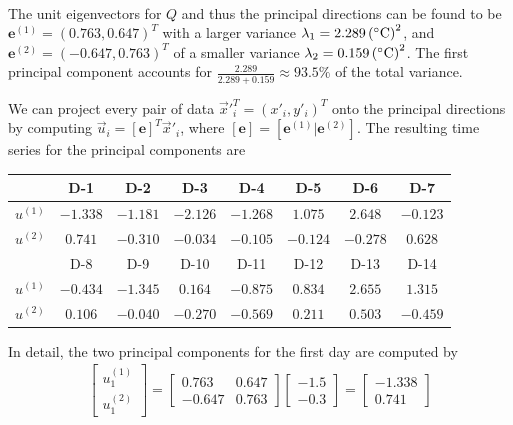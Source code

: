 \begin{solution}
\begin{align*}
\end{align*}
The unit eigenvectors for $Q$ and thus the principal directions can be found to be $\textbf{e}^{(1)} = (0.763, 0.647)^T$ with a larger variance $\lambda_1 = \SI{2.289}{\square {(\degree C)}}$, and $\textbf{e}^{(2)} = (-0.647, 0.763)^T$ of a smaller variance $\lambda_2 = \SI{0.159}{\square {(\degree C)}}$. The first principal component accounts for $\frac{2.289}{2.289+0.159} \approx 93.5\%$ of the total variance.\par
We can project every pair of data $\vec{x}'^T_i = (x'_i, y'_i)^T$ onto the principal directions by computing $\vec{u}_i = [\textbf{e}]^T\vec{x}'_i$, where $[\textbf{e}] = [\textbf{e}^{(1)}|\textbf{e}^{(2)}]$. The resulting time series for the principal components are 
\begin{center}
\begin{tabular}{|c|c|c|c|c|c|c|c|}
\hline
 & D-1 & D-2 & D-3 & D-4 & D-5 & D-6 & D-7 \\
\hline
$u^{(1)}$ & $-1.338$ & $-1.181$ & $-2.126$ & $-1.268$ & $1.075$ & $2.648$ & $-0.123$ \\
\hline
$u^{(2)}$ & $0.741$ & $-0.310$ & $-0.034$ & $-0.105$ & $-0.124$ & $-0.278$ & $0.628$ \\
\hline
 & D-8 & D-9 & D-10 & D-11 & D-12 & D-13 & D-14 \\
\hline
$u^{(1)}$ & $-0.434$ & $-1.345$ & $0.164$ & $-0.875$ & $0.834$ & $2.655$ & $1.315$ \\
\hline
$u^{(2)}$ & $0.106$ & $-0.040$ & $-0.270$ & $-0.569$ & $0.211$ & $0.503$ & $-0.459$ \\
\hline
\end{tabular}
\end{center}
In detail, the two principal components for the first day are computed by
\begin{align*}
\begin{bmatrix}
u_1^{(1)} \\
u_1^{(2)} 
\end{bmatrix}
=
\begin{bmatrix}
0.763 & 0.647 \\
-0.647 & 0.763
\end{bmatrix}
\begin{bmatrix}
-1.5 \\
-0.3
\end{bmatrix}
=
\begin{bmatrix}
-1.338\\
0.741
\end{bmatrix}
\end{align*}

\end{solution}
